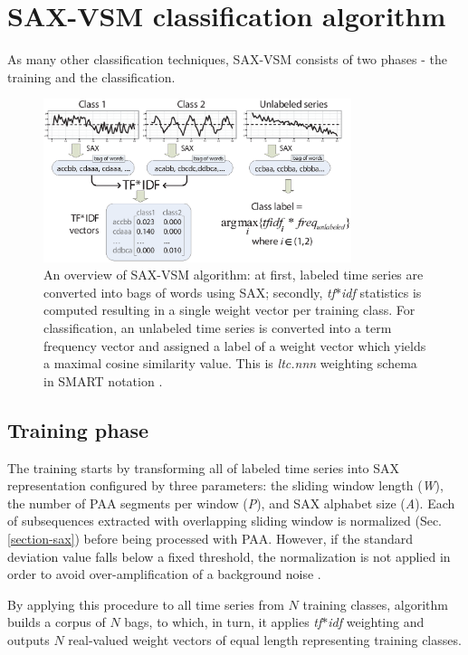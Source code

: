 \documentclass[conference]{IEEEtran}
\begin{document}
\vspace{0.1cm}
\section{SAX-VSM classification algorithm} \label{sax-vsm}
As many other classification techniques, SAX-VSM consists of two phases - 
the training and the classification. 

\begin{figure}[t]
   \centering
   \includegraphics[width=90mm]{figures/overview.eps}
   \caption{
   An overview of SAX-VSM algorithm: 
   at first, labeled time series are converted into bags of words using SAX; 
   secondly, \textit{tf$\ast$idf} statistics is computed resulting in 
   a single weight vector per training class. For classification, an unlabeled 
   time series is converted into a term frequency vector and assigned a 
   label of a weight vector which yields a maximal cosine similarity value.
   This is \textit{ltc.nnn} weighting schema in SMART notation \cite{logtf}.}
   \label{fig:overview}
\end{figure}

\subsection{Training phase}
The training starts by transforming all of labeled time series into SAX representation
configured by three parameters: the sliding window length (\textit{W}), 
the number of PAA segments per window (\textit{P}), 
and SAX alphabet size (\textit{A}).
Each of subsequences extracted with overlapping sliding window 
is normalized (Sec. \ref{section-sax}) before being processed with PAA. 
However, if the standard deviation value falls below a fixed threshold, the 
normalization is not applied in order to avoid over-amplification 
of a background noise \cite{sax}. 

By applying this procedure to all time series from $N$ training classes, 
algorithm builds a corpus of $N$ bags, to which, in turn, 
it applies \textit{tf$\ast$idf} weighting and outputs $N$ real-valued weight 
vectors of equal length representing training classes. 
\end{document}
